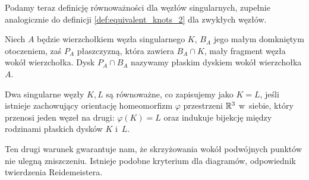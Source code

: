 Podamy teraz definicję równoważności dla węzłów singularnych, zupełnie analogicznie do definicji \ref{def:equivalent_knots_2} dla zwykłych węzłów.

\begin{definition}
    Niech $A$ będzie wierzchołkiem węzła singularnego $K$, $B_A$ jego małym domkniętym otoczeniem, zaś $P_A$ płaszczyzną, która zawiera $B_A \cap K$, mały fragment węzła wokół wierzchołka.
    Dysk $P_A \cap B_A$ nazywamy płaskim dyskiem wokół wierzchołka $A$.
\end{definition}

\begin{definition}
    Dwa singularne węzły $K, L$ są równoważne, co zapisujemy jako $K = L$, jeśli istnieje zachowujący orientację homeomorfizm $\varphi$ przestrzeni $\mathbb R^3$ w~siebie, który przenosi jeden węzeł na drugi: $\varphi(K) = L$ oraz indukuje bijekcję między rodzinami płaskich dysków $K$ i~$L$.
\end{definition}

Ten drugi warunek gwarantuje nam, że skrzyżowania wokół podwójnych punktów nie ulegną zniszczeniu.
Istnieje podobne kryterium dla diagramów, odpowiednik twierdzenia Reidemeistera.

